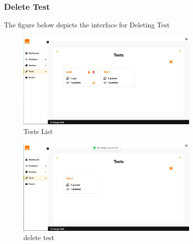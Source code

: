     \subsubsection{Delete Test}
    The figure below depicts the interface for Deleting Test
    \begin{figure}[h!]
        \centering*
        \includegraphics[width=0.8\textwidth]{images/test.JPG}
        \caption{ Tests List}
        \label{fig:Tests List}
    \end{figure}
    \begin{figure}[h!]
        \centering*
        \includegraphics[width=0.8\textwidth]{images/test2.JPG}
        \caption{delete test}
        \label{fig:Delete test}
    \end{figure}
